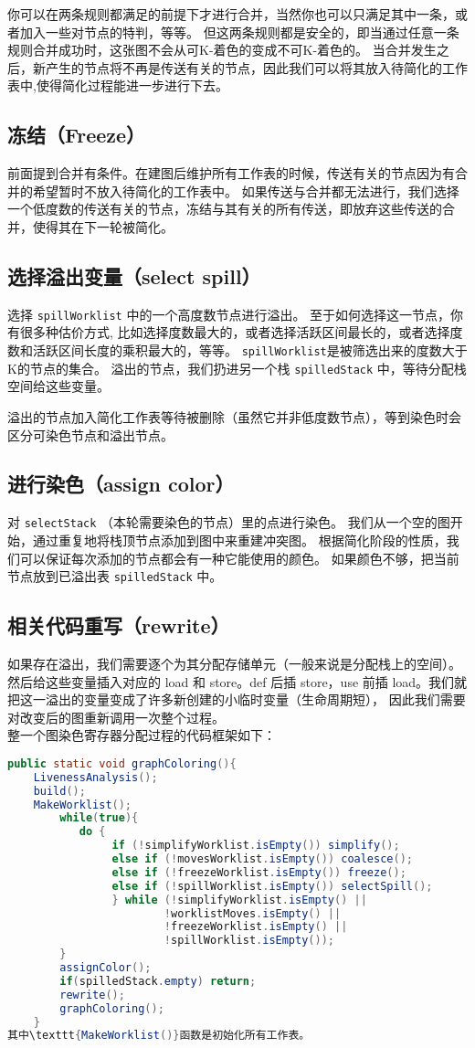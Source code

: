 你可以在两条规则都满足的前提下才进行合并，当然你也可以只满足其中一条，或者加入一些对节点的特判，等等。
但这两条规则都是安全的，即当通过任意一条规则合并成功时，这张图不会从可K-着色的变成不可K-着色的。
当合并发生之后，新产生的节点将不再是传送有关的节点，因此我们可以将其放入待简化的工作表中,使得简化过程能进一步进行下去。
\subsection{冻结（Freeze）}
前面提到合并有条件。在建图后维护所有工作表的时候，传送有关的节点因为有合并的希望暂时不放入待简化的工作表中。
如果传送与合并都无法进行，我们选择一个低度数的传送有关的节点，冻结与其有关的所有传送，即放弃这些传送的合并，使得其在下一轮被简化。
\subsection{选择溢出变量（select spill）}
选择 \texttt{spillWorklist} 中的一个高度数节点进行溢出。
至于如何选择这一节点，你有很多种估价方式, 比如选择度数最大的，或者选择活跃区间最长的，或者选择度数和活跃区间长度的乘积最大的，等等。
\texttt{spillWorklist}是被筛选出来的度数大于K的节点的集合。
溢出的节点，我们扔进另一个栈 \texttt{spilledStack} 中，等待分配栈空间给这些变量。

溢出的节点加入简化工作表等待被删除（虽然它并非低度数节点），等到染色时会区分可染色节点和溢出节点。
\subsection{进行染色（assign color）}
对 \texttt{selectStack} （本轮需要染色的节点）里的点进行染色。
我们从一个空的图开始，通过重复地将栈顶节点添加到图中来重建冲突图。
根据简化阶段的性质，我们可以保证每次添加的节点都会有一种它能使用的颜色。
如果颜色不够，把当前节点放到已溢出表 \texttt{spilledStack} 中。
\subsection{相关代码重写（rewrite）}
如果存在溢出，我们需要逐个为其分配存储单元（一般来说是分配栈上的空间）。
然后给这些变量插入对应的 load 和 store。def 后插 store，use 前插 load。我们就把这一溢出的变量变成了许多新创建的小临时变量（生命周期短），
因此我们需要对改变后的图重新调用一次整个过程。
~\\

整一个图染色寄存器分配过程的代码框架如下：
\begin{lstlisting}[language=java]
    public static void graphColoring(){
    LivenessAnalysis();    
    build();
    MakeWorklist();
        while(true){
           do {
                if (!simplifyWorklist.isEmpty()) simplify();
                else if (!movesWorklist.isEmpty()) coalesce();
                else if (!freezeWorklist.isEmpty()) freeze();
                else if (!spillWorklist.isEmpty()) selectSpill();
                } while (!simplifyWorklist.isEmpty() ||
                        !worklistMoves.isEmpty() ||
                        !freezeWorklist.isEmpty() ||
                        !spillWorklist.isEmpty());
        }
        assignColor();
        if(spilledStack.empty) return;
        rewrite();
        graphColoring();
    }
其中\texttt{MakeWorklist()}函数是初始化所有工作表。
\end{lstlisting}

